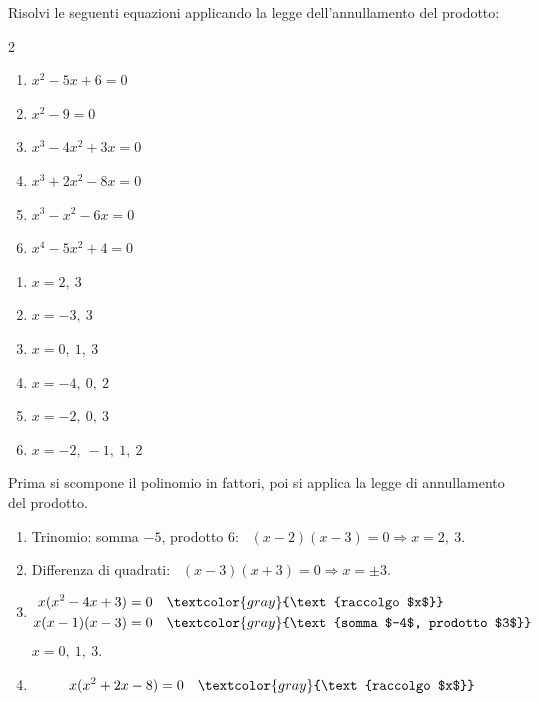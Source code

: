 
\begin{question}[ID=5.4, subtitle={Legge dell'annullamento del prodotto e scomposizione}, difficulty=media, tags={annullamento del prodotto}]
Risolvi le seguenti equazioni applicando la legge dell'annullamento del prodotto:
\begin{multicols}{2}
\begin{enumerate}[leftmargin=3cm]
    \item $x^2 - 5x + 6 = 0$
    \item $x^2 - 9 = 0$
    \item $x^3 - 4x^2 + 3x = 0$
    \item $x^3 + 2x^2 - 8x = 0$
    \item $x^3 - x^2 - 6x = 0$
    \item $x^4 - 5x^2 + 4 = 0$
\end{enumerate}
\end{multicols}
\begin{solution}
\begin{enumerate}
    \item $x=2,\ 3$
    \item $x=-3,\ 3$
    \item $x=0,\ 1,\ 3$
    \item $x=-4,\ 0,\ 2$
    \item $x=-2,\ 0,\ 3$
    \item $x=-2,\ -1,\ 1,\ 2$
\end{enumerate}
\end{solution}
\begin{explanation}
Prima si scompone il polinomio in fattori, poi si applica la legge di annullamento del prodotto.
\begin{enumerate}
    \item Trinomio: somma $-5$, prodotto $6$: \ $(x-2)(x-3)=0 \Rightarrow x=2,\ 3$.
    \item Differenza di quadrati: \ $(x-3)(x+3)=0 \Rightarrow x=\pm3$.
    \item \[\begin{aligned}
    x(x^2-4x+3) &= 0 && \textcolor{gray}{\text{raccolgo $x$}}\\
    x(x-1)(x-3) &= 0 && \textcolor{gray}{\text{somma $-4$, prodotto $3$}}
    \end{aligned}\]
    $x=0,\ 1,\ 3$.
    \item \[\begin{aligned}
    x(x^2+2x-8) &= 0 && \textcolor{gray}{\text{raccolgo $x$}}\\

\end{aligned}\]
\end{enumerate}
\end{explanation}
\end{question}
